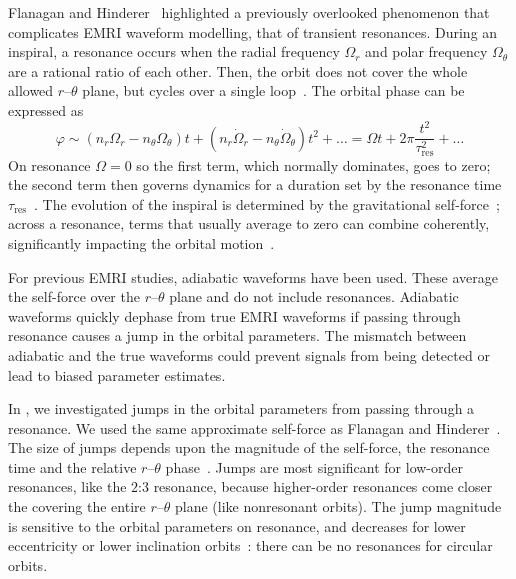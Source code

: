 \documentclass[a4paper]{jpconf}
\begin{document}
Flanagan and Hinderer~\cite{Flanagan2012} highlighted a previously overlooked phenomenon that complicates EMRI waveform modelling, that of transient resonances. During an inspiral, a resonance occurs when the radial frequency $\Omega_r$ and polar frequency $\Omega_\theta$ are a rational ratio of each other. Then, the orbit does not cover the whole allowed $r$--$\theta$ plane, but cycles over a single loop~\cite{Grossman2012}. The orbital phase can be expressed as
\begin{equation}
\varphi {} \sim {} \left(n_r \Omega_r - n_\theta \Omega_\theta\right) t + \left(n_r \dot{\Omega}_r - n_\theta \dot{\Omega}_\theta\right)t^2 + \ldots = \Omega t + 2\pi \frac{t^2}{\tau_\mathrm{res}^2} + \ldots
\end{equation}
On resonance $\Omega = 0$ so the first term, which normally dominates, goes to zero; the second term then governs dynamics for a duration set by the resonance time $\tau_\mathrm{res}$~\cite{Ruangsri2014,Berry2016a}. The evolution of the inspiral is determined by the gravitational self-force~\cite{Barack2009}; across a resonance, terms that usually average to zero can combine coherently, significantly impacting the orbital motion~\cite{Flanagan2012}.

For previous EMRI studies, adiabatic waveforms have been used. These average the self-force over the $r$--$\theta$ plane and do not include resonances. Adiabatic waveforms quickly dephase from true EMRI waveforms if passing through resonance causes a jump in the orbital parameters. The mismatch between adiabatic and the true waveforms could prevent signals from being detected or lead to biased parameter estimates.

In \cite{Berry2016a}, we investigated jumps in the orbital parameters from passing through a resonance. We used the same approximate self-force as Flanagan and Hinderer~\cite{Flanagan2012}. The size of jumps depends upon the magnitude of the self-force, the resonance time and the relative $r$--$\theta$ phase~\cite{Kevorkian1987,VanDeMeent2013,Berry2016a}. Jumps are most significant for low-order resonances, like the $2$:$3$ resonance, because higher-order resonances come closer the covering the entire $r$--$\theta$ plane (like nonresonant orbits). The jump magnitude is sensitive to the orbital parameters on resonance, and decreases for lower eccentricity or lower inclination orbits~\cite{Flanagan2012a}: there can be no resonances for circular orbits.

\end{document}
